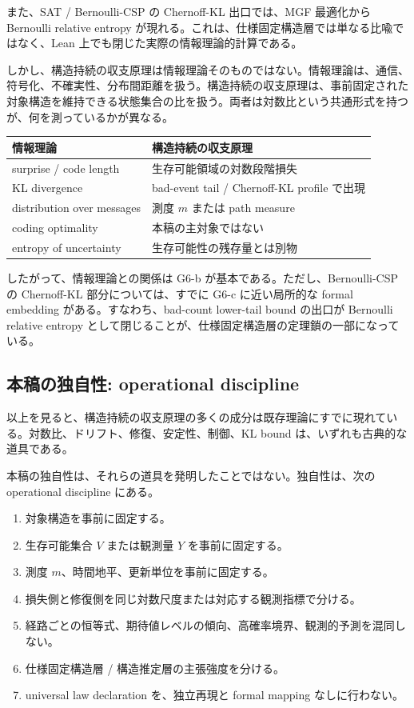 \documentclass[12pt,a4paper]{article}
\begin{document}
また、SAT / Bernoulli-CSP の Chernoff-KL 出口では、MGF 最適化から Bernoulli relative entropy が現れる。これは、仕様固定構造層では単なる比喩ではなく、Lean 上でも閉じた実際の情報理論的計算である。

しかし、構造持続の収支原理は情報理論そのものではない。情報理論は、通信、符号化、不確実性、分布間距離を扱う。構造持続の収支原理は、事前固定された対象構造を維持できる状態集合の比を扱う。両者は対数比という共通形式を持つが、何を測っているかが異なる。

{\def\LTcaptype{table} %
\begin{longtable}[]{@{}ll@{}}
\toprule\noalign{}
情報理論 & 構造持続の収支原理 \\
\midrule\noalign{}
\endhead
\bottomrule\noalign{}
\endlastfoot
surprise / code length & 生存可能領域の対数段階損失 \\
KL divergence & bad-event tail / Chernoff-KL profile で出現 \\
distribution over messages & 測度 \(m\) または path measure \\
coding optimality & 本稿の主対象ではない \\
entropy of uncertainty & 生存可能性の残存量とは別物 \\
\end{longtable}
}

したがって、情報理論との関係は G6-b が基本である。ただし、Bernoulli-CSP の Chernoff-KL 部分については、すでに G6-c に近い局所的な formal embedding がある。すなわち、bad-count lower-tail bound の出口が Bernoulli relative entropy として閉じることが、仕様固定構造層の定理鎖の一部になっている。

\subsection{本稿の独自性: operational discipline}\label{ux672cux7a3fux306eux72ecux81eaux6027-operational-discipline}

以上を見ると、構造持続の収支原理の多くの成分は既存理論にすでに現れている。対数比、ドリフト、修復、安定性、制御、KL bound は、いずれも古典的な道具である。

本稿の独自性は、それらの道具を発明したことではない。独自性は、次の operational discipline にある。

\begin{enumerate}
\def\labelenumi{\arabic{enumi}.}
\tightlist
\item
  対象構造を事前に固定する。
\item
  生存可能集合 \(V\) または観測量 \(Y\) を事前に固定する。
\item
  測度 \(m\)、時間地平、更新単位を事前に固定する。
\item
  損失側と修復側を同じ対数尺度または対応する観測指標で分ける。
\item
  経路ごとの恒等式、期待値レベルの傾向、高確率境界、観測的予測を混同しない。
\item
  仕様固定構造層 / 構造推定層の主張強度を分ける。
\item
  universal law declaration を、独立再現と formal mapping なしに行わない。
\end{enumerate}
\end{document}
